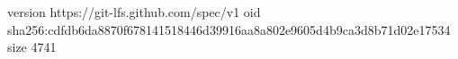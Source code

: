 version https://git-lfs.github.com/spec/v1
oid sha256:cdfdb6da8870f678141518446d39916aa8a802e9605d4b9ca3d8b71d02e17534
size 4741
